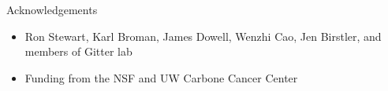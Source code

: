 \documentclass[10pt]{beamer}
\begin{document}
\begin{frame}{Acknowledgements}

\begin{itemize}
\item Ron Stewart, Karl Broman, James Dowell, Wenzhi Cao, Jen Birstler, and members of Gitter lab
\item Funding from the NSF and UW Carbone Cancer Center
\end{itemize}

\end{frame}



\end{document}
